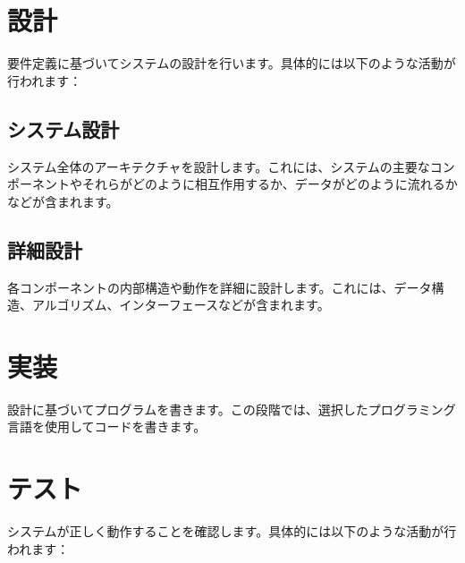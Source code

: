 \chapter{設計}
要件定義に基づいてシステムの設計を行います。具体的には以下のような活動が行われます：




\section{システム設計}
システム全体のアーキテクチャを設計します。これには、システムの主要なコンポーネントやそれらがどのように相互作用するか、データがどのように流れるかなどが含まれます。




\section{詳細設計}
各コンポーネントの内部構造や動作を詳細に設計します。これには、データ構造、アルゴリズム、インターフェースなどが含まれます。



\chapter{実装}
設計に基づいてプログラムを書きます。この段階では、選択したプログラミング言語を使用してコードを書きます。



\chapter{テスト}
システムが正しく動作することを確認します。具体的には以下のような活動が行われます：




